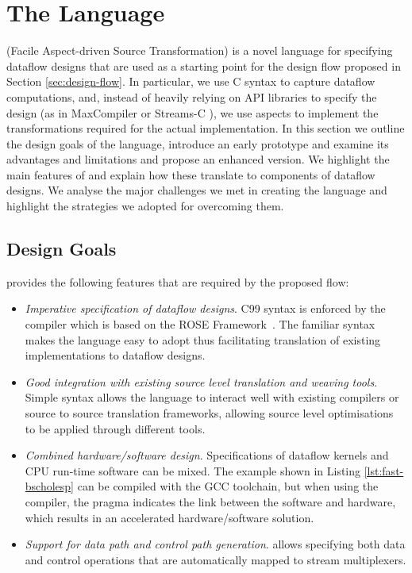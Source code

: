 \chapter{The \FAST{} Language}
\label{sec:fast}

\FAST{} (Facile Aspect-driven Source Transformation) is a novel
language for specifying dataflow designs that are used as a starting
point for the design flow proposed in Section
\ref{sec:design-flow}. In particular, we use C syntax to capture
dataflow computations, and, instead of heavily relying on API
libraries to specify the design (as in MaxCompiler \cite{5719584} or
Streams-C \cite{Gokhale:Stone:Arnold:Kalinowski:2000}), we use aspects
to implement the transformations required for the actual
implementation.  In this section we outline the design goals of the
language, introduce an early prototype and examine its advantages and
limitations and propose an enhanced version. We highlight the main
features of \FAST{} and explain how these translate to components of
dataflow designs. We analyse the major challenges we met in creating
the \FAST{} language and highlight the strategies we adopted for
overcoming them.

\section{Design Goals}

\FAST{} provides the following features that are
required by the proposed flow:

\begin{itemize}
\item \emph{Imperative specification of dataflow designs}. C99 syntax
  is enforced by the \FAST{} compiler which is based on the ROSE
  Framework~\cite{Quinlan:2000}. The familiar syntax makes the
  language easy to adopt thus facilitating translation of existing
  implementations to dataflow designs.
\item \emph{Good integration with existing source level translation and
    weaving tools}. Simple syntax allows the language to interact well
  with existing compilers or source to source translation frameworks,
  allowing source level optimisations to be applied through different
  tools.
\item \emph{Combined hardware/software design}. Specifications of dataflow
  kernels and CPU run-time software can be mixed. The example shown in
  Listing \ref{lst:fast-bscholesp} can be compiled with the GCC toolchain,
  but when using the \FAST{} compiler, the pragma indicates the link
  between the software and hardware, which results in an accelerated
  hardware/software solution.
\item \emph{Support for data path and control path generation}. \FAST{}
  allows specifying both data and control operations that are
  automatically mapped to stream multiplexers.
\end{itemize}

